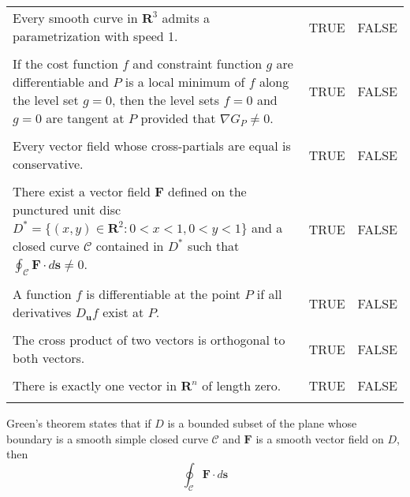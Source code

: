 \documentclass[12pt]{exam}
\newcommand{\R}{\mathbf{R}}
\begin{document}
\begin{questions}
\begin{tabular}{p{5in}cc}
Every smooth curve in $\R^3$ admits a parametrization with speed 1. & TRUE & FALSE \\
 & & \\
If the cost function $f$ and constraint function $g$ are differentiable and $P$ is a local minimum of $f$ along the level set $g = 0$, then the level sets $f= 0 $ and $g = 0$ are tangent at $P$ provided that $\nabla G_P \ne 0$. & TRUE & FALSE \\
 & & \\
Every vector field whose cross-partials are equal is conservative. & TRUE & FALSE \\
 & & \\
There exist a vector field $\mathbf{F}$ defined on the punctured unit disc $D^{\ast} = \{ (x, y) \in \R^2 : 0 < x < 1, 0 < y < 1 \}$ and a closed curve $\mathcal{C}$ contained in $D^{\ast}$ such that $\oint_{\mathcal{C}} \mathbf{F}\cdot d\mathbf{s} \ne 0$. & TRUE & FALSE \\
 & & \\
A function $f$ is differentiable at the point $P$ if all derivatives $D_{\mathbf{u}} f$ exist at $P$. & TRUE & FALSE \\
& & \\
The cross product of two vectors is orthogonal to both vectors. & TRUE & FALSE \\
& & \\
There is exactly one vector in $\R^n$ of length zero. & TRUE & FALSE \\
& & \\

\end{tabular}

\newpage

\question Green's theorem states that if $D$ is a bounded subset of the plane whose boundary is a smooth simple closed curve $\mathcal{C}$ and $\mathbf{F}$ is a smooth vector field on $D$, then
\[
    \oint_{\mathcal{C}} \mathbf{F}\cdot d\mathbf{s}
\]

\end{questions}
\end{document}
